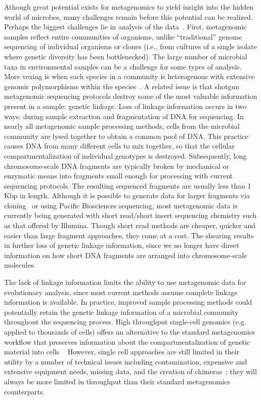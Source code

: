 \documentclass[10pt]{article}
\begin{document}
Athough great potential exists for metagenomics to yield insight into the hidden world of microbes, many challenges remain before this potential can be realized.
Perhaps the biggest challenges lie in analysis of the data~\cite{chen2005bioinformatics}.
First, metagenomic samples reflect entire communities of organisms, unlike ``traditional'' genome sequencing of individual organisms or clones (i.e., from cultures of a single isolate where genetic diversity has been bottlenecked).
The large number of microbial taxa in environmental samples can be a challenge for some types of analysis.
More vexing is when each species in a community is heterogenous with extensive genomic polymorphisms within the species~\cite{kunin2008bioinformatician}.
A related issue is that shotgun metagenomic sequencing protocols destroy some of the most valuable information present in a sample: genetic linkage.
Loss of linkage information occurs in two ways: during sample extraction and fragmentation of DNA for sequencing.
In nearly all metagenomic sample processing methods, cells from the microbial community are lysed together to obtain a common pool of DNA.
This practice causes DNA from many different cells to mix together, so that the cellular compartmentalization of individual genotypes is destroyed.
Subsequently, long chromosome-scale DNA fragments are typically broken by mechanical or enzymatic means into fragments small enough for processing with current sequencing protocols.
The resulting sequenced fragments are usually less than 1 Kbp in length.  Although it is possible to generate data for larger fragments via cloning~\cite{beja2000bacterial} or using Pacific Biosciences sequencing, most metagenomic data is currently being generated with short read/short insert sequencing chemistry such as that offered by Illumina.  Though short read methods are cheaper, quicker and easier than large fragment approaches, they come at a cost.  The shearing results in further loss of genetic linkage information, since we no longer have direct information on how short DNA fragments are arranged into chromosome-scale molecules.

The lack of linkage information limits the ability to use metagenomic data for evolutionary analysis, since most current methods assume complete linkage information is available.
In practice, improved sample processing methods could potentially retain the genetic linkage information of a microbial community throughout the sequencing process.
High throughput single-cell genomics (e.g. applied to thousands of cells) offers an alternative to the standard metagenomics workflow that preserves information about the compartmentalization of genetic material into cells ~\cite{Woyke2010,lasken2012genomic,rinke2013insights}
However, single cell approaches are still limited in their utility by a number of technical issues including contamination, expensive and extensive equipment needs, missing data, and the creation of chimeras~\cite{blainey2013future}; they will always be more limited in throughput than their standard metagenomics counterparts.
\end{document}
